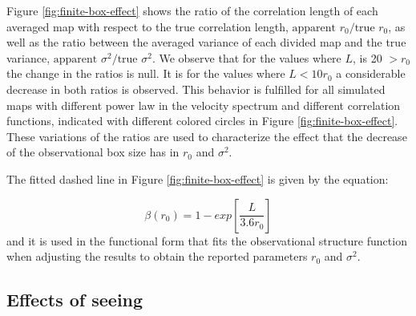 \documentclass[fleqn,usenatbib, useAMS, a4paper]{mnras}
\begin{document}
Figure \ref{fig:finite-box-effect} shows the ratio of the correlation length of each averaged map with respect to the true correlation length, \(\text{apparent } r_ 0 /\text{true } r_0 \), as well as the ratio between the averaged variance of each divided map and the true variance, \(\text{apparent } \sigma^2  / \text{true } \sigma^2\).
We observe that for the values where \(L\), is 20 $> r_0 $ the change in the ratios is null.
It is for the values where \( L < 10 r_0 \) a considerable decrease in both ratios is observed.
This behavior is fulfilled for all simulated maps with different power law in the velocity spectrum and different correlation functions, indicated with different colored circles in Figure \ref{fig:finite-box-effect}. 
These variations of the ratios are used to characterize the effect that the decrease of the observational box size has in \(r_0\) and \(\sigma^2\).

The fitted dashed line in Figure \ref{fig:finite-box-effect} is given by the equation: 

\begin{equation}\label{eq:ajustebox}
\beta(r_0) = 1 - exp \left[ \frac{L}{3.6r_0} \right] 
\end{equation}
%
and it is used in the functional form that fits the observational structure function when adjusting the results to obtain the reported parameters \(r_0\) and \(\sigma^2 \). 


\subsection{Effects of seeing}
\label{sec:effects-seeing-struc}
\end{document}
